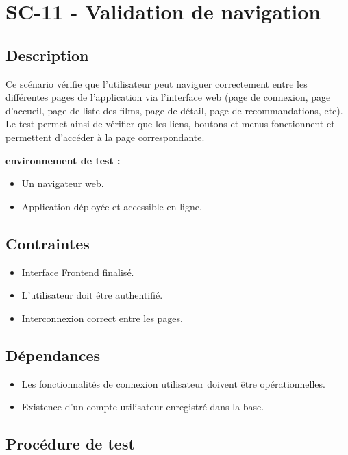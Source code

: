 \documentclass[a4paper,12pt]{report}
\begin{document}
\section{SC-11 - Validation de navigation }
\label{Nav1}
\subsection*{Description}
Ce scénario vérifie que l’utilisateur peut naviguer correctement entre les différentes pages de l’application via l’interface web (page de connexion, page d’accueil, page de liste des films, page de détail, page de recommandations, etc). Le test permet ainsi de vérifier que les liens, boutons et menus fonctionnent et permettent d'accéder à la page correspondante.

\textbf{environnement de test :}
\begin{itemize}
    \item Un navigateur web.
    \item Application déployée et accessible en ligne.

\end{itemize}
 \subsection*{Contraintes}
\begin{itemize}
    \item Interface Frontend finalisé.
    \item L'utilisateur doit être authentifié.
    \item Interconnexion correct entre les pages.
    
\end{itemize}
 
\subsection*{Dépendances}
\begin{itemize}
    \item Les fonctionnalités de connexion utilisateur doivent être opérationnelles.
    \item Existence d'un compte utilisateur enregistré dans la base. 

\end{itemize}

\subsection*{Procédure de test}
\end{document}
